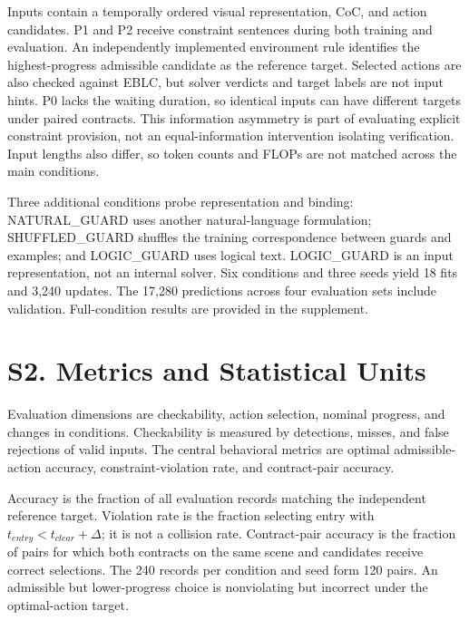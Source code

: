 \documentclass[11pt,a4paper]{article}
\begin{document}
Inputs contain a temporally ordered visual representation, CoC, and action candidates. P1 and P2 receive constraint sentences during both training and evaluation. An independently implemented environment rule identifies the highest-progress admissible candidate as the reference target. Selected actions are also checked against EBLC, but solver verdicts and target labels are not input hints. P0 lacks the waiting duration, so identical inputs can have different targets under paired contracts. This information asymmetry is part of evaluating explicit constraint provision, not an equal-information intervention isolating verification. Input lengths also differ, so token counts and FLOPs are not matched across the main conditions.\par

Three additional conditions probe representation and binding: NATURAL\_GUARD uses another natural-language formulation; SHUFFLED\_GUARD shuffles the training correspondence between guards and examples; and LOGIC\_GUARD uses logical text. LOGIC\_GUARD is an input representation, not an internal solver. Six conditions and three seeds yield 18 fits and 3,240 updates. The 17,280 predictions across four evaluation sets include validation. Full-condition results are provided in the supplement.\par

\section*{S2. Metrics and Statistical Units}

Evaluation dimensions are checkability, action selection, nominal progress, and changes in conditions. Checkability is measured by detections, misses, and false rejections of valid inputs. The central behavioral metrics are optimal admissible-action accuracy, constraint-violation rate, and contract-pair accuracy.\par

Accuracy is the fraction of all evaluation records matching the independent reference target. Violation rate is the fraction selecting entry with \(t_{entry}<t_{clear}+\Delta\); it is not a collision rate. Contract-pair accuracy is the fraction of pairs for which both contracts on the same scene and candidates receive correct selections. The 240 records per condition and seed form 120 pairs. An admissible but lower-progress choice is nonviolating but incorrect under the optimal-action target.\par
\end{document}
